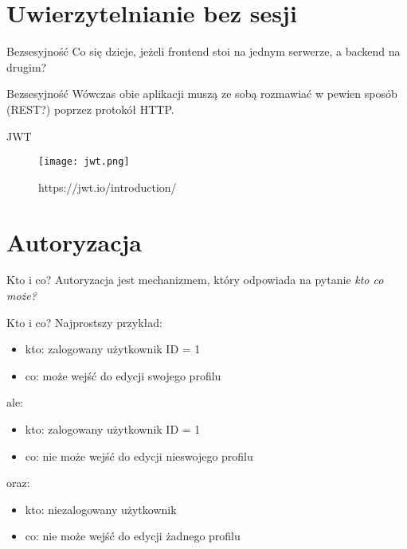\section{Uwierzytelnianie bez sesji}

\begin{frame}{Bezsesyjność}
	Co się dzieje, jeżeli frontend stoi na jednym serwerze, a backend na drugim?
\end{frame}

\begin{frame}{Bezsesyjność}
	Wówczas obie aplikacji muszą ze sobą rozmawiać w pewien sposób (REST?) poprzez protokół HTTP.
\end{frame}

\begin{frame}{JWT}
	\begin{figure}[t]
		\centering
		\texttt{[image: jwt.png]}
		\caption{https://jwt.io/introduction/}
	\end{figure}
\end{frame}

\section{Autoryzacja}

\begin{frame}{Kto i co?}
	Autoryzacja jest mechanizmem, który odpowiada na pytanie \emph{kto co może?}
\end{frame}

\begin{frame}{Kto i co?}
	Najprostszy przykład:
	\begin{itemize}
		\item kto: zalogowany użytkownik ID = 1
		\item co: może wejść do edycji swojego profilu
	\end{itemize}
	
	ale:
	\begin{itemize}
		\item kto: zalogowany użytkownik ID = 1
		\item co: nie może wejść do edycji nieswojego profilu
	\end{itemize}
	
	oraz:
	\begin{itemize}
		\item kto: niezalogowany użytkownik
		\item co: nie może wejść do edycji żadnego profilu
	\end{itemize}
\end{frame}

